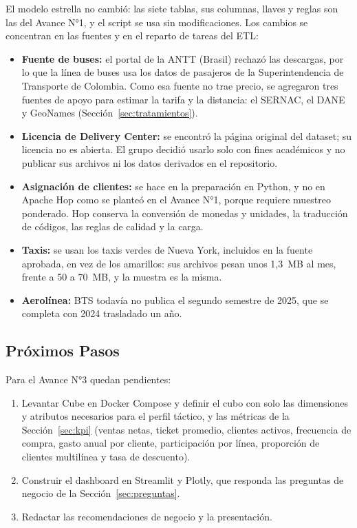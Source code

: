El modelo estrella no cambió: las siete tablas, sus columnas, llaves y reglas
son las del Avance N°1, y el script  se usa sin modificaciones.
Los cambios se concentran en las fuentes y en el reparto de tareas del ETL:

\begin{itemize}[leftmargin=*]
  \item \textbf{Fuente de buses:} el portal de la ANTT (Brasil) rechazó las
        descargas, por lo que la línea de buses usa los datos de pasajeros de
        la Superintendencia de Transporte de Colombia. Como esa fuente no trae
        precio, se agregaron tres fuentes de apoyo para estimar la tarifa y la
        distancia: el SERNAC, el DANE y GeoNames
        (Sección~\ref{sec:tratamientos}).
  \item \textbf{Licencia de Delivery Center:} se encontró la página original
        del dataset; su licencia no es abierta. El grupo decidió usarlo solo
        con fines académicos y no publicar sus archivos ni los datos derivados
        en el repositorio.
  \item \textbf{Asignación de clientes:} se hace en la preparación en Python, y
        no en Apache Hop como se planteó en el Avance N°1, porque requiere
        muestreo ponderado. Hop conserva la conversión de monedas y unidades,
        la traducción de códigos, las reglas de calidad y la carga.
  \item \textbf{Taxis:} se usan los taxis verdes de Nueva York, incluidos en la
        fuente aprobada, en vez de los amarillos: sus archivos pesan unos
        1,3~MB al mes, frente a 50 a 70~MB, y la muestra es la misma.
  \item \textbf{Aerolínea:} BTS todavía no publica el segundo semestre de
        2025, que se completa con 2024 trasladado un año.
\end{itemize}

\subsection{Próximos Pasos}

Para el Avance N°3 quedan pendientes:

\begin{enumerate}[leftmargin=*]
  \item Levantar Cube en Docker Compose y definir el cubo con solo las
        dimensiones y atributos necesarios para el perfil táctico, y las
        métricas de la Sección~\ref{sec:kpi} (ventas netas, ticket promedio,
        clientes activos, frecuencia de compra, gasto anual por cliente,
        participación por línea, proporción de clientes multilínea y tasa de descuento).
  \item Construir el dashboard en Streamlit y Plotly, que responda las
        preguntas de negocio de la Sección~\ref{sec:preguntas}.
  \item Redactar las recomendaciones de negocio y la presentación.
\end{enumerate}

